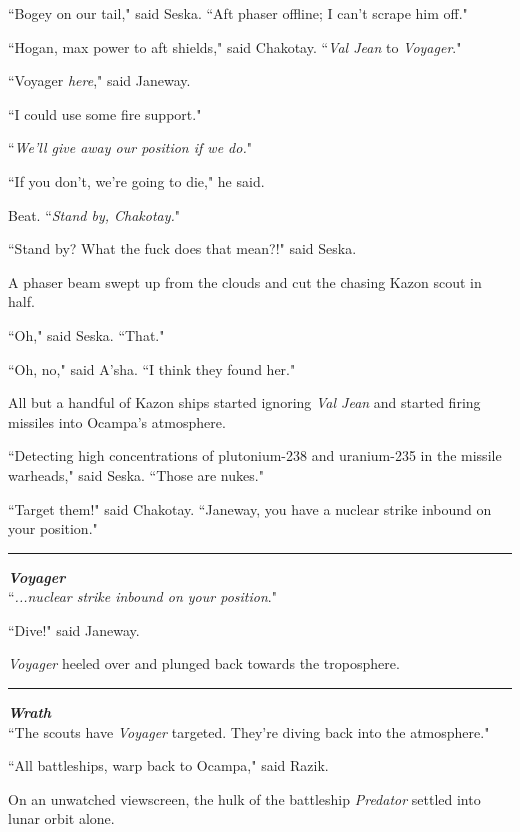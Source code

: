 \documentclass[twoside,letterpaper,12pt]{memoir}
\begin{document}
``Bogey on our tail," said Seska. ``Aft phaser offline; I can't scrape him off."

``Hogan, max power to aft shields," said Chakotay. ``\textit{Val Jean} to \textit{Voyager}."

``Voyager \textit{here}," said Janeway.

``I could use some fire support."

``\textit{We'll give away our position if we do.}"

``If you don't, we're going to die," he said.

Beat. ``\textit{Stand by, Chakotay.}"

``Stand by? What the fuck does that mean?!" said Seska.

A phaser beam swept up from the clouds and cut the chasing Kazon scout in half.

``Oh," said Seska. ``That."

``Oh, no," said A'sha. ``I think they found her."

All but a handful of Kazon ships started ignoring \textit{Val Jean} and started firing missiles into Ocampa's atmosphere.

``Detecting high concentrations of plutonium-238 and uranium-235 in the missile warheads," said Seska. ``Those are nukes."

``Target them!" said Chakotay. ``Janeway, you have a nuclear strike inbound on your position."

\begin{center}\rule{3cm}{0.4 pt}\end{center}

\noindent\textit{\textbf{Voyager}}\\

``\textit{...nuclear strike inbound on your position}."

``Dive!" said Janeway.

\textit{Voyager} heeled over and plunged back towards the troposphere.

\begin{center}\rule{3cm}{0.4 pt}\end{center}

\noindent\textit{\textbf{Wrath}}\\

``The scouts have \textit{Voyager} targeted. They're diving back into the atmosphere."

``All battleships, warp back to Ocampa," said Razik.

On an unwatched viewscreen, the hulk of the battleship \textit{Predator} settled into lunar orbit alone.
\end{document}
